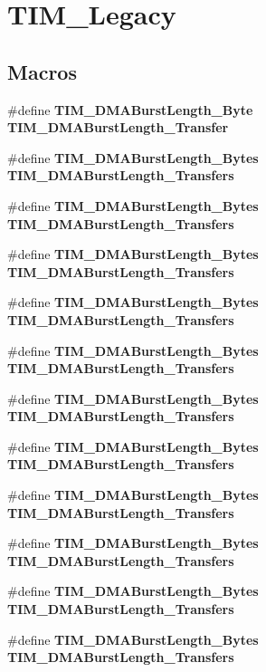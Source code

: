 \section{T\+I\+M\+\_\+\+Legacy}
\label{group__TIM__Legacy}
\subsection*{Macros}
\begin{DoxyCompactItemize}
\item 
\#define \textbf{ T\+I\+M\+\_\+\+D\+M\+A\+Burst\+Length\+\_\+Byte}~\textbf{ T\+I\+M\+\_\+\+D\+M\+A\+Burst\+Length\+\_\+Transfer}
\item 
\#define \textbf{ T\+I\+M\+\_\+\+D\+M\+A\+Burst\+Length\+\_\+Bytes}~\textbf{ T\+I\+M\+\_\+\+D\+M\+A\+Burst\+Length\+\_\+Transfers}
\item 
\#define \textbf{ T\+I\+M\+\_\+\+D\+M\+A\+Burst\+Length\+\_\+Bytes}~\textbf{ T\+I\+M\+\_\+\+D\+M\+A\+Burst\+Length\+\_\+Transfers}
\item 
\#define \textbf{ T\+I\+M\+\_\+\+D\+M\+A\+Burst\+Length\+\_\+Bytes}~\textbf{ T\+I\+M\+\_\+\+D\+M\+A\+Burst\+Length\+\_\+Transfers}
\item 
\#define \textbf{ T\+I\+M\+\_\+\+D\+M\+A\+Burst\+Length\+\_\+Bytes}~\textbf{ T\+I\+M\+\_\+\+D\+M\+A\+Burst\+Length\+\_\+Transfers}
\item 
\#define \textbf{ T\+I\+M\+\_\+\+D\+M\+A\+Burst\+Length\+\_\+Bytes}~\textbf{ T\+I\+M\+\_\+\+D\+M\+A\+Burst\+Length\+\_\+Transfers}
\item 
\#define \textbf{ T\+I\+M\+\_\+\+D\+M\+A\+Burst\+Length\+\_\+Bytes}~\textbf{ T\+I\+M\+\_\+\+D\+M\+A\+Burst\+Length\+\_\+Transfers}
\item 
\#define \textbf{ T\+I\+M\+\_\+\+D\+M\+A\+Burst\+Length\+\_\+Bytes}~\textbf{ T\+I\+M\+\_\+\+D\+M\+A\+Burst\+Length\+\_\+Transfers}
\item 
\#define \textbf{ T\+I\+M\+\_\+\+D\+M\+A\+Burst\+Length\+\_\+Bytes}~\textbf{ T\+I\+M\+\_\+\+D\+M\+A\+Burst\+Length\+\_\+Transfers}
\item 
\#define \textbf{ T\+I\+M\+\_\+\+D\+M\+A\+Burst\+Length\+\_\+Bytes}~\textbf{ T\+I\+M\+\_\+\+D\+M\+A\+Burst\+Length\+\_\+Transfers}
\item 
\#define \textbf{ T\+I\+M\+\_\+\+D\+M\+A\+Burst\+Length\+\_\+Bytes}~\textbf{ T\+I\+M\+\_\+\+D\+M\+A\+Burst\+Length\+\_\+Transfers}
\item 
\#define \textbf{ T\+I\+M\+\_\+\+D\+M\+A\+Burst\+Length\+\_\+Bytes}~\textbf{ T\+I\+M\+\_\+\+D\+M\+A\+Burst\+Length\+\_\+Transfers}

\end{DoxyCompactItemize}
